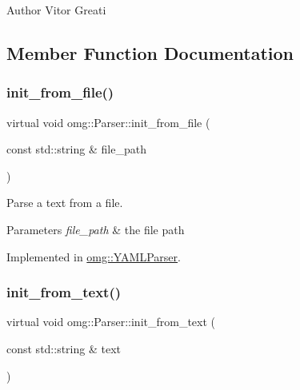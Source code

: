\begin{DoxyAuthor}{Author}
Vitor Greati 
\end{DoxyAuthor}


\subsection{Member Function Documentation}
\mbox{\label{classomg_1_1_parser_aa0c44ed0f01edc2958667589d66ebe8a}} 
\subsubsection{\texorpdfstring{init\_from\_file()}{init\_from\_file()}}
{\footnotesize\ttfamily virtual void omg\+::\+Parser\+::init\+\_\+from\+\_\+file (\begin{DoxyParamCaption}\item[{const std\+::string \&}]{file\+\_\+path }\end{DoxyParamCaption})\hspace{0.3cm}{\ttfamily [pure virtual]}}



Parse a text from a file. 


\begin{DoxyParams}{Parameters}
{\em file\+\_\+path} & the file path \\
\hline
\end{DoxyParams}


Implemented in \mbox{\hyperlink{classomg_1_1_y_a_m_l_parser_a88af0bc72d0f4ce3e9e489e0b6037a53}{omg\+::\+Y\+A\+M\+L\+Parser}}.

\mbox{\label{classomg_1_1_parser_af47d9c929199cbf845d3150defc499f0}} 
\subsubsection{\texorpdfstring{init\_from\_text()}{init\_from\_text()}}
{\footnotesize\ttfamily virtual void omg\+::\+Parser\+::init\+\_\+from\+\_\+text (\begin{DoxyParamCaption}\item[{const std\+::string \&}]{text }\end{DoxyParamCaption})\hspace{0.3cm}{\ttfamily [pure virtual]}}



